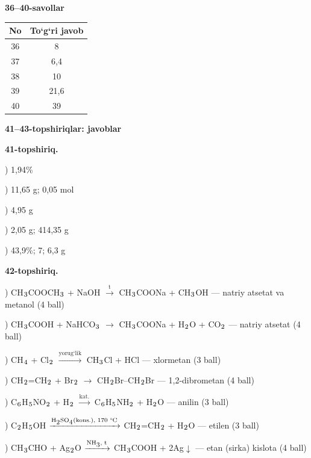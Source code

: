 \documentclass[11pt,a4paper]{article}
\renewcommand{\textsubscript}[1]{\ensuremath{_{\text{\fontsize{8}{8}\selectfont #1}}}}
\begin{document}
\noindent\textbf{36--40-savollar}\par\smallskip
\noindent\begin{tabular}{|c|c|}\hline \textbf{No} & \textbf{To`g`ri javob}\\\hline
36 & 8\\\hline
37 & 6,4\\\hline
38 & 10\\\hline
39 & 21,6\\\hline
40 & 39\\\hline
\end{tabular}\par\medskip
\noindent\textbf{41--43-topshiriqlar: javoblar}\par\smallskip
\noindent\textbf{41-topshiriq.}\par
{}) 1,94\%\par
{}) 11,65 g; 0,05 mol\par
{}) 4,95 g\par
{}) 2,05 g; 414,35 g\par
{}) 43,9\%; 7; 6,3 g\par
\noindent\textbf{42-topshiriq.}\par
{}) CH\textsubscript{3}COOCH\textsubscript{3} + NaOH $\xrightarrow{\text{t}}$ CH\textsubscript{3}COONa + CH\textsubscript{3}OH --- natriy atsetat va metanol (4 ball)\par
{}) CH\textsubscript{3}COOH + NaHCO\textsubscript{3} $\to$ CH\textsubscript{3}COONa + H\textsubscript{2}O + CO\textsubscript{2} --- natriy atsetat (4 ball)\par
{}) CH\textsubscript{4} + Cl\textsubscript{2} $\xrightarrow{\text{yorug`lik}}$ CH\textsubscript{3}Cl + HCl --- xlormetan (3 ball)\par
{}) CH\textsubscript{2}=CH\textsubscript{2} + Br\textsubscript{2} $\to$ CH\textsubscript{2}Br--CH\textsubscript{2}Br --- 1,2-dibrometan (4 ball)\par
{}) C\textsubscript{6}H\textsubscript{5}NO\textsubscript{2} + H\textsubscript{2} $\xrightarrow{\text{kat.}}$ C\textsubscript{6}H\textsubscript{5}NH\textsubscript{2} + H\textsubscript{2}O --- anilin (3 ball)\par
{}) C\textsubscript{2}H\textsubscript{5}OH $\xrightarrow{\text{H\textsubscript{2}SO\textsubscript{4}(kons.), 170 \textdegree{}C}}$ CH\textsubscript{2}=CH\textsubscript{2} + H\textsubscript{2}O --- etilen (3 ball)\par
{}) CH\textsubscript{3}CHO + Ag\textsubscript{2}O $\xrightarrow{\text{NH\textsubscript{3}, t}}$ CH\textsubscript{3}COOH + 2Ag$\downarrow$ --- etan (sirka) kislota (4 ball)\par
\end{document}
